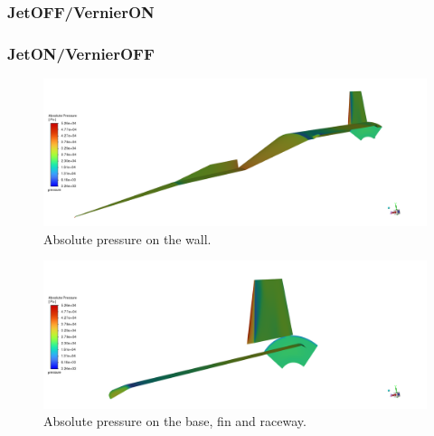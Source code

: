 \documentclass[12pt]{article}
\begin{document}
\subsubsection{JetOFF/VernierON}

\subsubsection{JetON/VernierOFF}

\begin{figure}[H]
    \centering
    \includegraphics[width=\linewidth]{figs/t60s/Pabs_wall.png}
    \caption{Absolute pressure on the wall.}
    \label{fig:t60s_wall_pabs}
\end{figure}
\begin{figure}[H]
    \centering
    \includegraphics[width=\linewidth]{figs/t60s/Pabs_base_fin_raceway.png}
    \caption{Absolute pressure on the base, fin and raceway.}
    \label{fig:t60s_base_fin_raceway_pabs}
\end{figure}
\end{document}
